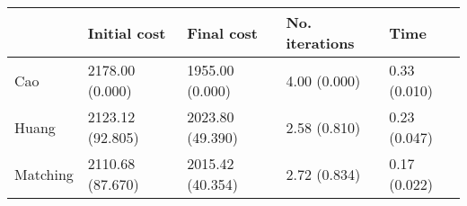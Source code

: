 \begin{tabular}{lllll}
\toprule
{} &      Initial cost &        Final cost & No. iterations &          Time \\
\midrule
Cao      &   2178.00 (0.000) &   1955.00 (0.000) &   4.00 (0.000) &  0.33 (0.010) \\
Huang    &  2123.12 (92.805) &  2023.80 (49.390) &   2.58 (0.810) &  0.23 (0.047) \\
Matching &  2110.68 (87.670) &  2015.42 (40.354) &   2.72 (0.834) &  0.17 (0.022) \\
\bottomrule
\end{tabular}
